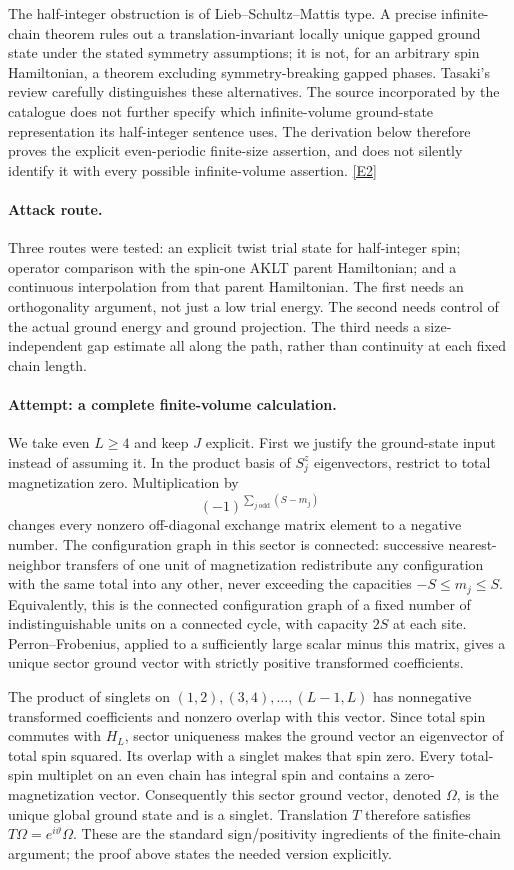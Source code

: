 \documentclass[11pt,a4paper]{article}
\newcommand{\eref}[2]{\hyperlink{extra:#1:#2}{[E#2]}}
\numberwithin{equation}{section}
\begin{document}
The half-integer obstruction is of Lieb--Schultz--Mattis type. A precise
infinite-chain theorem rules out a translation-invariant locally unique
gapped ground state under the stated symmetry assumptions; it is not, for
an arbitrary spin Hamiltonian, a theorem excluding symmetry-breaking
gapped phases. Tasaki's review carefully distinguishes these alternatives.
The source incorporated by the catalogue does not further specify which
infinite-volume ground-state representation its half-integer sentence uses.
The derivation below therefore proves the explicit even-periodic
finite-size assertion, and does not silently identify it with every possible
infinite-volume assertion. \eref{statement}{2}

\paragraph{Attack route.}
Three routes were tested: an explicit twist trial state for half-integer
spin; operator comparison with the spin-one AKLT parent Hamiltonian; and a
continuous interpolation from that parent Hamiltonian. The first needs an
orthogonality argument, not just a low trial energy. The second needs control
of the actual ground energy and ground projection. The third needs a
size-independent gap estimate all along the path, rather than continuity
at each fixed chain length.

\paragraph{Attempt: a complete finite-volume calculation.}
We take even $L\geq4$ and keep $J$ explicit. First we justify the ground-state
input instead of assuming it. In the product basis of $S_j^z$ eigenvectors,
restrict to total magnetization zero. Multiplication by
\[
 (-1)^{\sum_{j\ \mathrm{odd}}(S-m_j)}
\]
changes every nonzero off-diagonal exchange matrix element to a negative
number. The configuration graph in this sector is connected: successive
nearest-neighbor transfers of one unit of magnetization redistribute any
configuration with the same total into any other, never exceeding the
capacities $-S\leq m_j\leq S$. Equivalently, this is the connected configuration
graph of a fixed number of indistinguishable units on a connected cycle,
with capacity $2S$ at each site. Perron--Frobenius, applied to a sufficiently
large scalar minus this matrix, gives a unique sector ground vector with
strictly positive transformed coefficients.

The product of singlets on $(1,2),(3,4),\ldots,(L-1,L)$ has nonnegative
transformed coefficients and nonzero overlap with this vector. Since total
spin commutes with $H_L$, sector uniqueness makes the ground vector an
eigenvector of total spin squared. Its overlap with a singlet makes that
spin zero. Every total-spin multiplet on an even chain has integral spin
and contains a zero-magnetization vector. Consequently this sector ground
vector, denoted $\Omega$, is the unique global ground state and is a
singlet. Translation $T$ therefore satisfies $T\Omega=e^{i\vartheta}\Omega$.
These are the standard sign/positivity ingredients of the finite-chain
argument; the proof above states the needed version explicitly.
\end{document}
